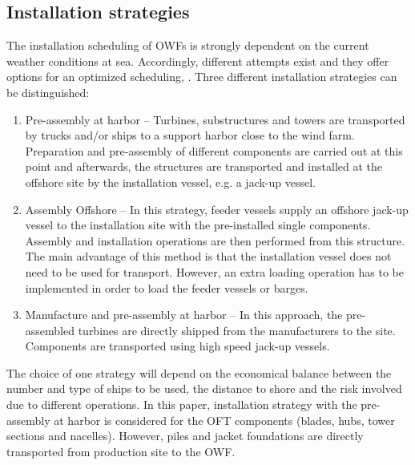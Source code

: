 \subsection{Installation strategies}
The installation scheduling of OWFs is strongly dependent on the current weather conditions at sea. Accordingly, different attempts exist and they offer options for an optimized scheduling, \cite{Thalemann2012}. Three different installation strategies can be distinguished:

\begin{enumerate}
\item Pre-assembly at harbor -- Turbines, substructures and towers are transported by trucks and/or ships to a support harbor close to the wind farm. Preparation and pre-assembly of different components are carried out at this point and afterwards, the structures are transported and installed at the offshore site by the installation vessel, e.g. a jack-up vessel.
\item Assembly Offshore -- In this strategy, feeder vessels supply an offshore jack-up vessel to the installation site with the pre-installed single components. Assembly and installation operations are then performed from this structure. The main advantage of this method is that the installation vessel does not need to be used for transport. However, an extra loading operation has to be implemented in order to load the feeder vessels or barges.
\item Manufacture and pre-assembly at harbor -- In this approach, the pre-assembled turbines are directly shipped from the manufacturers to the site. Components are transported using high speed jack-up vessels.
\end{enumerate}

The choice of one strategy will depend on the economical balance between the number and type of ships to be used, the distance to shore and the risk involved due to different operations. In this paper, installation strategy with the pre-assembly at harbor is considered for the OFT components (blades, hubs, tower sections and nacelles). However, piles and jacket foundations are directly transported from production site to the OWF. 